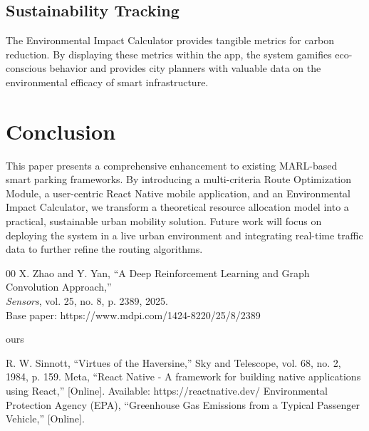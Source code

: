 \documentclass[conference]{IEEEtran}
\begin{document}
\subsection{Sustainability Tracking}
The Environmental Impact Calculator provides tangible metrics for carbon reduction. By displaying these metrics within the app, the system gamifies eco-conscious behavior and provides city planners with valuable data on the environmental efficacy of smart infrastructure.

\section{Conclusion}
This paper presents a comprehensive enhancement to existing MARL-based smart parking frameworks. By introducing a multi-criteria Route Optimization Module, a user-centric React Native mobile application, and an Environmental Impact Calculator, we transform a theoretical resource allocation model into a practical, sustainable urban mobility solution. Future work will focus on deploying the system in a live urban environment and integrating real-time traffic data to further refine the routing algorithms.

\begin{thebibliography}{00}
X. Zhao and Y. Yan, ``A Deep Reinforcement Learning and Graph Convolution Approach,'' \\
\emph{Sensors}, vol. 25, no. 8, p. 2389, 2025. \\
Base paper: https://www.mdpi.com/1424-8220/25/8/2389

ours

 R. W. Sinnott, ``Virtues of the Haversine,'' Sky and Telescope, vol. 68, no. 2, 1984, p. 159.
 Meta, ``React Native - A framework for building native applications using React,'' [Online]. Available: https://reactnative.dev/
 Environmental Protection Agency (EPA), ``Greenhouse Gas Emissions from a Typical Passenger Vehicle,'' [Online].
\end{thebibliography}
\end{document}

